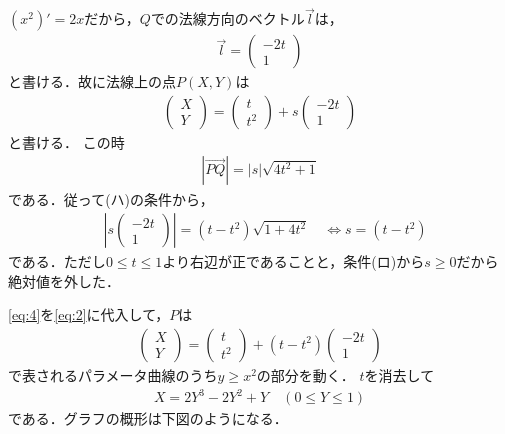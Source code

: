 \documentclass[../../main.tex]{subfiles}
\begin{document}
$(x^2)'=2x$だから，$Q$での法線方向のベクトル$\vec{l}$は，
\begin{align}
  \vec{l}=
  \begin{pmatrix} -2t \\ 1
  \end{pmatrix} \label{eq:1}
\end{align}
と書ける．故に法線上の点$P(X,Y)$は
\begin{align}
  \begin{pmatrix} X \\ Y
  \end{pmatrix}=
  \begin{pmatrix} t \\ t^2
  \end{pmatrix}+s
  \begin{pmatrix} -2t \\ 1
  \end{pmatrix} \label{eq:2}
\end{align}
と書ける．
この時
\begin{align}
  |\overrightarrow{PQ}| = |s|\sqrt{4t^2+1} \label{eq:3}
\end{align}
である．従って(ハ)の条件から，
\begin{align}
  &\left|s
  \begin{pmatrix} -2t \\ 1
  \end{pmatrix}\right|=(t-t^2)\sqrt{1+4t^2}
  \quad\Longleftrightarrow
  s=(t-t^2) \label{eq:4}
\end{align}
である．ただし$0\le t \le 1$より右辺が正であることと，条件(ロ)から$s \ge 0$だから絶対値を外した．

\cref{eq:4}を\cref{eq:2}に代入して，$P$は
\begin{align}
  \begin{pmatrix} X \\ Y
  \end{pmatrix}
  =
  \begin{pmatrix} t \\ t^2
  \end{pmatrix}+(t-t^2)
  \begin{pmatrix} -2t \\ 1
  \end{pmatrix}
\end{align}
で表されるパラメータ曲線のうち$y\ge x^2$の部分を動く．
$t$を消去して
\begin{align}
  X=2Y^3-2Y^2+Y \quad (0\le Y\le 1)
\end{align}
である．グラフの概形は下図のようになる．
\end{document}
